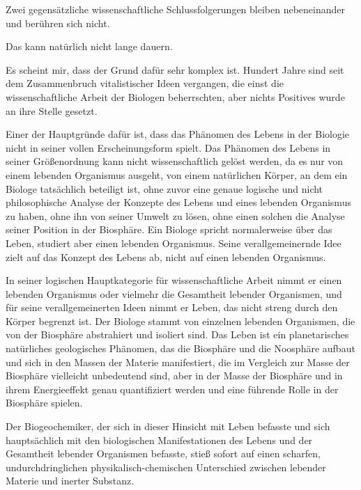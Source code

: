 \documentclass[11pt,a4paper]{book}
\begin{document}
Zwei gegensätzliche wissenschaftliche Schlussfolgerungen bleiben nebeneinander und berühren sich nicht.



Das kann natürlich nicht lange dauern.



Es scheint mir, dass der Grund dafür sehr komplex ist. Hundert Jahre sind seit dem Zusammenbruch vitalistischer Ideen vergangen, die einst die wissenschaftliche Arbeit der Biologen beherrschten, aber nichts Positives wurde an ihre Stelle gesetzt.



Einer der Hauptgründe dafür ist, dass das Phänomen des Lebens in der Biologie nicht in seiner vollen Erscheinungsform spielt. Das Phänomen des Lebens in seiner Größenordnung kann nicht wissenschaftlich gelöst werden, da es nur von einem lebenden Organismus ausgeht, von einem natürlichen Körper, an dem ein Biologe tatsächlich beteiligt ist, ohne zuvor eine genaue logische und nicht philosophische Analyse der Konzepte des Lebens und eines lebenden Organismus zu haben, ohne ihn von seiner Umwelt zu lösen, ohne einen solchen die Analyse seiner Position in der Biosphäre. Ein Biologe spricht normalerweise über das Leben, studiert aber einen lebenden Organismus. Seine verallgemeinernde Idee zielt auf das Konzept des Lebens ab, nicht auf einen lebenden Organismus.



In seiner logischen Hauptkategorie für wissenschaftliche Arbeit nimmt er einen lebenden Organismus oder vielmehr die Gesamtheit lebender Organismen, und für seine verallgemeinerten Ideen nimmt er Leben, das nicht streng durch den Körper begrenzt ist. Der Biologe stammt von einzelnen lebenden Organismen, die von der Biosphäre abstrahiert und isoliert sind. Das Leben ist ein planetarisches natürliches geologisches Phänomen, das die Biosphäre und die Noosphäre aufbaut und sich in den Massen der Materie manifestiert, die im Vergleich zur Masse der Biosphäre vielleicht unbedeutend sind, aber in der Masse der Biosphäre und in ihrem Energieeffekt genau quantifiziert werden und eine führende Rolle in der Biosphäre spielen.



Der Biogeochemiker, der sich in dieser Hinsicht mit Leben befasste und sich hauptsächlich mit den biologischen Manifestationen des Lebens und der Gesamtheit lebender Organismen befasste, stieß sofort auf einen scharfen, undurchdringlichen physikalisch-chemischen Unterschied zwischen lebender Materie und inerter Substanz.
\end{document}
